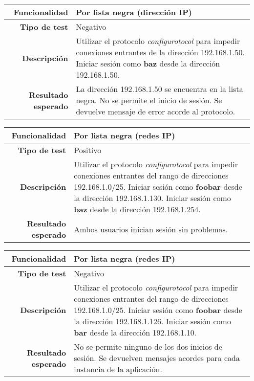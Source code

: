 \documentclass[a4paper,10pt]{article}
\begin{document}
\begin{center}
  \begin{tabular}{|r|p{12.5cm}|}
    \hline
    \textbf{Funcionalidad}	&	Por lista negra (dirección IP)\\
    \hline
    \textbf{Tipo de test}	&	Negativo\\
    \hline
    \textbf{Descripción}	&	Utilizar el protocolo \textit{configurotocol} para impedir conexiones
					entrantes de la dirección 192.168.1.50. Iniciar sesión como
					\textbf{baz} desde la dirección 192.168.1.50.\\
    \hline
    \textbf{Resultado esperado}	&	La dirección 192.168.1.50 se encuentra en la lista negra. No se permite
					el inicio de sesión. Se devuelve mensaje de error acorde al protocolo.\\
    \hline   
  \end{tabular}
\end{center}

\begin{center}
  \begin{tabular}{|r|p{12.5cm}|}
    \hline
    \textbf{Funcionalidad}	&	Por lista negra (redes IP)\\
    \hline
    \textbf{Tipo de test}	&	Positivo\\
    \hline
    \textbf{Descripción}	&	Utilizar el protocolo \textit{configurotocol} para impedir conexiones
					entrantes del rango de direcciones 192.168.1.0/25. Iniciar sesión como
					\textbf{foobar} desde la dirección 192.168.1.130. Iniciar sesión como
					\textbf{baz} desde la dirección 192.168.1.254.\\
    \hline
    \textbf{Resultado esperado}	&	Ambos usuarios inician sesión sin problemas.\\
    \hline   
  \end{tabular}
\end{center}

\begin{center}
  \begin{tabular}{|r|p{12.5cm}|}
    \hline
    \textbf{Funcionalidad}	&	Por lista negra (redes IP)\\
    \hline
    \textbf{Tipo de test}	&	Negativo\\
    \hline
    \textbf{Descripción}	&	Utilizar el protocolo \textit{configurotocol} para impedir conexiones
					entrantes del rango de direcciones 192.168.1.0/25. Iniciar sesión como
					\textbf{foobar} desde la dirección 192.168.1.126. Iniciar sesión como
					\textbf{bar} desde la dirección 192.168.1.10.\\
    \hline
    \textbf{Resultado esperado}	&	No se permite ninguno de los dos inicios de sesión. Se devuelven mensajes
					acordes para cada instancia de la aplicación.\\
    \hline   
  \end{tabular}
\end{center}
\end{document}
